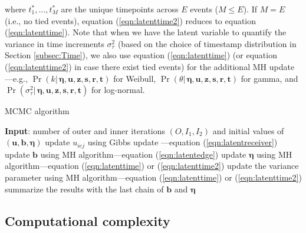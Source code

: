 \documentclass[ba]{imsart}
\def\spacingset#1{\renewcommand{\baselinestretch}%
	{#1}\small\normalsize} \spacingset{1}
\numberwithin{equation}{section}
\theoremstyle{plain}
\begin{document}
	where $t_1^*,\ldots,t_M^*$ are the unique timepoints across $E$ events ($M \leq E$). If $M=E$ (i.e., no tied events), equation (\ref{eqn:latenttime2}) reduces to equation (\ref{eqn:latenttime}). Note that when we have the latent variable to quantify the variance in time increments $\sigma_\tau^2$ (based on the choice of timestamp distribution in Section \ref{subsec:Time}), we also use equation (\ref{eqn:latenttime}) (or equation (\ref{eqn:latenttime2}) in case there exist tied events) for the additional MH update---e.g., $\Pr(k|\, \boldsymbol{\eta},\boldsymbol{u}, \boldsymbol{z},\boldsymbol{s}, \boldsymbol{r},\boldsymbol{t})$ for Weibull, $\Pr(\theta|\, \boldsymbol{\eta},\boldsymbol{u}, \boldsymbol{z},\boldsymbol{s}, \boldsymbol{r},\boldsymbol{t})$ for gamma, and  $\Pr(\sigma^2_\tau| \,\boldsymbol{\eta},\boldsymbol{u}, \boldsymbol{z},\boldsymbol{s}, \boldsymbol{r},\boldsymbol{t})$ for log-normal.~
		\begin{algorithm}[!t]
			\spacingset{1}
			\SetAlgoLined
			\caption{MCMC algorithm}
			\begin{algorithmic}
				\STATE \textbf{Input}: number of outer and inner iterations $(O, I_1, I_2)$ and initial values of $(\boldsymbol{u}, \boldsymbol{b}, \boldsymbol{\eta})$
				\vskip 0.1in
				\STATE update $u_{iej}$ using Gibbs update ---equation (\ref{eqn:latentreceiver})
				\ENDFOR
				\ENDFOR
				\ENDFOR
				\STATE update $\boldsymbol{b}$ using MH algorithm---equation (\ref{eqn:latentedge})
				\ENDFOR
				\STATE update $\boldsymbol{\eta}$ using MH algorithm---equation (\ref{eqn:latenttime}) or (\ref{eqn:latenttime2}) 
				\ENDFOR
				\STATE update the variance parameter using MH algorithm---equation (\ref{eqn:latenttime}) or (\ref{eqn:latenttime2}) 
				\ENDIF
				\ENDFOR
				\STATE	summarize the results with the last chain of $\boldsymbol{b}$ and $\boldsymbol{\eta}$
			\end{algorithmic}
			\label{alg:MCMC}
		\end{algorithm}
	\subsection{Computational complexity}\label{subsec:computation}
\end{document}
